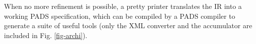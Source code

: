 \documentclass{sig-alternate-sigmod08}
\begin{document}

%

When no more refinement is possible, a pretty printer 
translates the IR into a working PADS 
specification,  which can be compiled by a PADS compiler to generate
a suite of useful tools (only the XML converter and the accumulator are included
in Fig. \ref{fig-archi}). 

%



\end{document}
